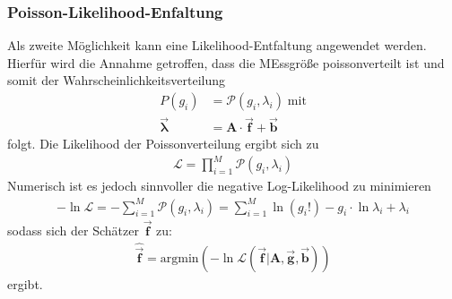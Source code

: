 \subsubsection{Poisson-Likelihood-Enfaltung}
Als zweite Möglichkeit kann eine Likelihood-Entfaltung angewendet werden. 
Hierfür wird die Annahme getroffen, dass die MEssgröße poissonverteilt ist und somit der Wahrscheinlichkeitsverteilung
\begin{align}
	P(g_{i}) &= \mathcal{P}(g_{i},\lambda_{i}) \; \text{mit}\\
	\vec{\pmb{\lambda}} &= \pmb{A} \cdot \vec{\pmb{f}} + \vec{\pmb{b}}
\end{align}
folgt.
Die Likelihood der Poissonverteilung ergibt sich zu
\begin{align}
	\mathcal{L} = \prod_{i=1}^{M}\mathcal{P}(g_{i},\lambda_{i})
\end{align}
Numerisch ist es jedoch sinnvoller die negative Log-Likelihood zu minimieren
\begin{align}
	- \ln\mathcal{L} = - \sum_{i=1}^{M}\mathcal{P}(g_{i},\lambda_{i}) = \sum_{i=1}^{M}\ln(g_{i}!) - g_{i} \cdot \ln \lambda_{i} +\lambda_{i}
	\label{eqn:loglike}
\end{align}
sodass sich der Schätzer $\vec{\pmb{f}}$ zu:
\begin{align}
	\hat{\vec{\pmb{f}}} = \text{argmin}\left(- \ln\mathcal{L}( \vec{\pmb{f}}|\pmb{A},\vec{\pmb{g}},\vec{\pmb{b}})\right)
	\label{eqn:fLike}
\end{align}
ergibt.


